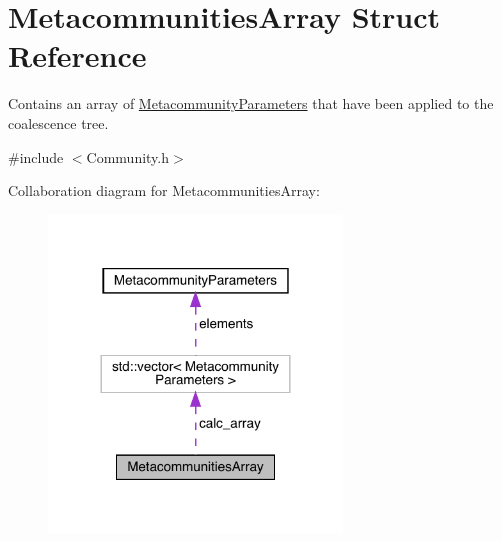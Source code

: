 \hypertarget{struct_metacommunities_array}{}\section{Metacommunities\+Array Struct Reference}
\label{struct_metacommunities_array}


Contains an array of \hyperlink{struct_metacommunity_parameters}{Metacommunity\+Parameters} that have been applied to the coalescence tree.  




{\ttfamily \#include $<$Community.\+h$>$}



Collaboration diagram for Metacommunities\+Array\+:\nopagebreak
\begin{figure}[H]
\begin{center}
\leavevmode
\includegraphics[width=221pt]{struct_metacommunities_array__coll__graph}
\end{center}
\end{figure}
